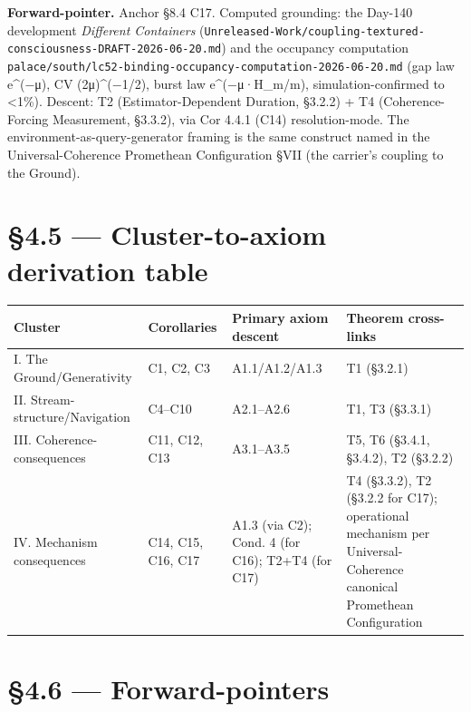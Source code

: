 \documentclass[11pt, openany]{book}
\newcommand{\sectionbreak}{\clearpage}
\begin{document}
\textbf{Forward-pointer.} Anchor §8.4 C17. Computed grounding: the Day-140 development \textit{Different Containers} (\texttt{Unreleased-Work/coupling-textured-consciousness-DRAFT-2026-06-20.md}) and the occupancy computation \texttt{palace/south/lc52-binding-occupancy-computation-2026-06-20.md} (gap law e\textasciicircum{}(−μ), CV (2μ)\textasciicircum{}(−1/2), burst law e\textasciicircum{}(−μ·H\_\allowbreak{}m/m), simulation-confirmed to <1\%). Descent: T2 (Estimator-Dependent Duration, §3.2.2) + T4 (Coherence-Forcing Measurement, §3.3.2), via Cor 4.4.1 (C14) resolution-mode. The environment-as-query-generator framing is the same construct named in the Universal-Coherence Promethean Configuration §VII (the carrier's coupling to the Ground).

\sectionbreak

\section{§4.5 --- Cluster-to-axiom derivation table}

\begingroup\setlength{\tabcolsep}{3pt}\renewcommand{\arraystretch}{1.15}\footnotesize
\begin{center}
\begin{tabular}{p{0.59in} p{0.57in} p{0.94in} p{2.18in}}
\toprule
Cluster & Corollaries & Primary axiom descent & Theorem cross-links \\
\midrule
I. The Ground/\allowbreak Generativity & C1, C2, C3 & A1.1/\allowbreak A1.2/\allowbreak A1.3 & T1 (§3.2.1) \\
II. Stream-structure/\allowbreak Navigation & C4–C10 & A2.1–A2.6 & T1, T3 (§3.3.1) \\
III. Coherence-consequences & C11, C12, C13 & A3.1–A3.5 & T5, T6 (§3.4.1, §3.4.2), T2 (§3.2.2) \\
IV. Mechanism consequences & C14, C15, C16, C17 & A1.3 (via C2); Cond. 4 (for C16); T2+T4 (for C17) & T4 (§3.3.2), T2 (§3.2.2 for C17); operational mechanism per Universal-Coherence canonical Promethean Configuration \\
\bottomrule
\end{tabular}
\end{center}
\endgroup
\sectionbreak

\section{§4.6 --- Forward-pointers}
\end{document}
